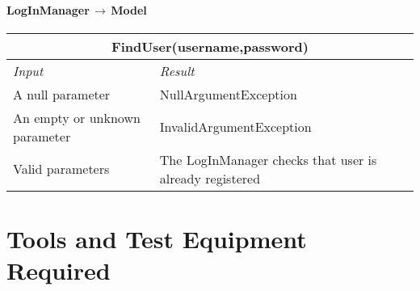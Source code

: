 \documentclass[11pt,a4paper]{report}
\begin{document}
\subsubsection{LogInManager$\,\to\,$Model}
\begin{tabularx}{\textwidth}{|X|X|}
	\hline
	\multicolumn{2}{|c|}{\textbf{FindUser(username,password)}}\\
	\hline
	\textit{Input} & \textit{Result}\\
	\hline
	A null parameter & NullArgumentException\\
	\hline
	An empty or unknown parameter & InvalidArgumentException\\
	\hline
	Valid parameters & The LogInManager checks that user is already registered\\
	\hline
\end{tabularx}
\chapter{Tools and Test Equipment Required}
\end{document}
